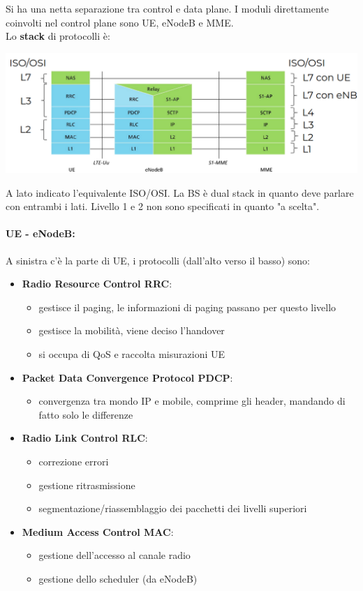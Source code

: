 Si ha una netta separazione tra control e data plane. I moduli direttamente coinvolti nel control plane sono UE, eNodeB e MME.\\

Lo \textbf{stack} di protocolli è:
\begin{center}
	\includegraphics[width=0.9\linewidth]{img/4g/cps}
\end{center}

A lato indicato l'equivalente ISO/OSI. La BS è dual stack in quanto deve parlare con entrambi i lati. Livello 1 e 2 non sono specificati in quanto "a scelta".\\

\paragraph{UE - eNodeB:} A sinistra c'è la parte di UE, i protocolli (dall'alto verso il basso) sono:
\begin{itemize}
	\item \textbf{Radio Resource Control RRC}:
	\begin{itemize}
		\item gestisce il paging, le informazioni di paging passano per questo livello
		\item gestisce la mobilità, viene deciso l'handover
		\item si occupa di QoS e raccolta misurazioni UE
	\end{itemize}
	
	\item \textbf{Packet Data Convergence Protocol PDCP}:
	\begin{itemize}
		\item convergenza tra mondo IP e mobile, comprime gli header, mandando di fatto solo le differenze
	\end{itemize}
	
	\item \textbf{Radio Link Control RLC}:
	\begin{itemize}
		\item correzione errori
		\item gestione ritrasmissione
		\item segmentazione/riassemblaggio dei pacchetti dei livelli superiori
	\end{itemize}
	
	\item \textbf{Medium Access Control MAC}:
	\begin{itemize}
		\item gestione dell'accesso al canale radio
		\item gestione dello scheduler (da eNodeB)
	\end{itemize}
\end{itemize}

